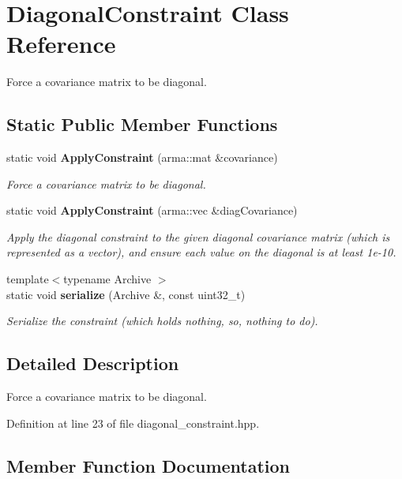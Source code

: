 \section{Diagonal\+Constraint Class Reference}
\label{classmlpack_1_1gmm_1_1DiagonalConstraint}


Force a covariance matrix to be diagonal.  


\subsection*{Static Public Member Functions}
\begin{DoxyCompactItemize}
\item 
static void \textbf{ Apply\+Constraint} (arma\+::mat \&covariance)
\begin{DoxyCompactList}\small\item\em Force a covariance matrix to be diagonal. \end{DoxyCompactList}\item 
static void \textbf{ Apply\+Constraint} (arma\+::vec \&diag\+Covariance)
\begin{DoxyCompactList}\small\item\em Apply the diagonal constraint to the given diagonal covariance matrix (which is represented as a vector), and ensure each value on the diagonal is at least 1e-\/10. \end{DoxyCompactList}\item 
{\footnotesize template$<$typename Archive $>$ }\\static void \textbf{ serialize} (Archive \&, const uint32\+\_\+t)
\begin{DoxyCompactList}\small\item\em Serialize the constraint (which holds nothing, so, nothing to do). \end{DoxyCompactList}\end{DoxyCompactItemize}


\subsection{Detailed Description}
Force a covariance matrix to be diagonal. 

Definition at line 23 of file diagonal\+\_\+constraint.\+hpp.



\subsection{Member Function Documentation}
\mbox{\label{classmlpack_1_1gmm_1_1DiagonalConstraint_a1e68c9489180b84b3a8d1e265a3d8a8f}} 
